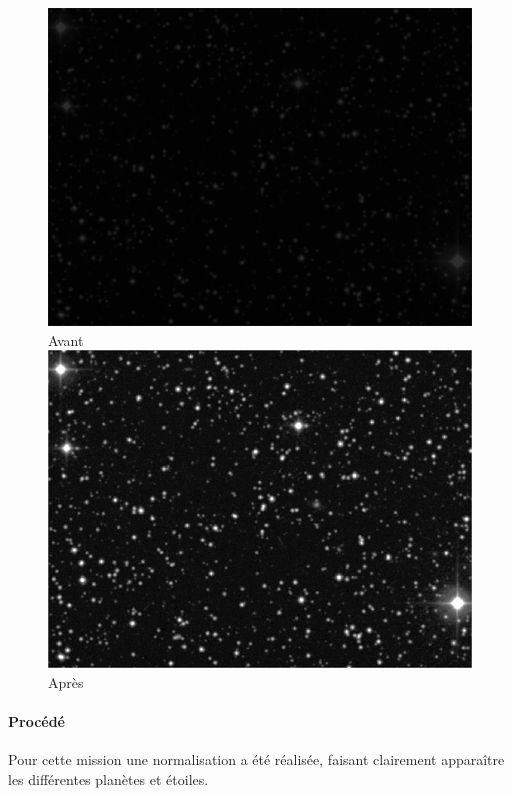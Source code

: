 	\begin{figure}[h]
	\centering
		\begin{multicols}{2}
		\includegraphics[scale=0.525]{images/GD61.png}
		Avant
		\includegraphics[scale=0.525]{images/GD61AFTER.png}
		Après
		\end{multicols}
	\end{figure}
	\vspace{-0.9cm}

		\paragraph{Procédé}	
			Pour cette mission une normalisation a été réalisée, faisant clairement apparaître les différentes planètes et étoiles.